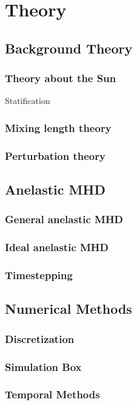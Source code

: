 \chapter{Theory}
\section{Background Theory}
\subsection{Theory about the Sun}
Statification

\subsection{Mixing length theory}
\subsection{Perturbation theory}

\section{Anelastic MHD}
\subsection{General anelastic MHD}




\subsection{Ideal anelastic MHD}



\subsection{Timestepping}

\section{Numerical Methods}
\subsection{Discretization}
\subsection{Simulation Box}
\subsection{Temporal Methods}
